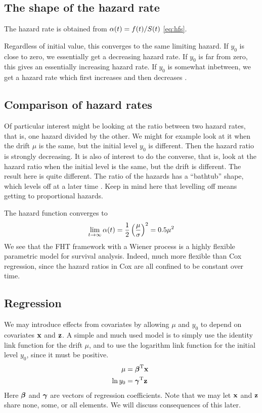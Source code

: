 \subsection{The shape of the hazard rate}
The hazard rate is obtained from $\alpha(t)=f(t)/S(t)$ \eqref{eq:hfs}.

Regardless of initial value, this converges to the same limiting hazard. If $y_0$ is close to zero, we essentially get a decreasing hazard rate. If $y_0$ is far from zero, this gives an essentially increasing hazard rate. If $y_0$ is somewhat inbetween, we get a hazard rate which first increases and then decreases \citep{ABG}.

\subsection{Comparison of hazard rates}
Of particular interest might be looking at the ratio between two hazard rates, that is, one hazard divided by the other. We might for example look at it when the drift $\mu$ is the same, but the initial level $y_0$ is different. Then the hazard ratio is strongly decreasing. It is also of interest to do the converse, that is, look at the hazard ratio when the initial level is the same, but the drift is different. The result here is quite different. The ratio of the hazards has a ``bathtub'' shape, which levels off at a later time \citep{ABG}. Keep in mind here that levelling off means getting to proportional hazards.

The hazard function converges to
\begin{equation}
    \lim_{t\to\infty}\alpha(t)=\frac{1}{2}\left(\frac{\mu}{\sigma}\right)^2=0.5\mu^2
\end{equation}
We see that the FHT framework with a Wiener process is a highly flexible parametric model for survival analysis. Indeed, much more flexible than Cox regression, since the hazard ratios in Cox are all confined to be constant over time.

\subsection{Regression}
We may introduce effects from covariates by allowing $\mu$ and $y_0$ to depend on covariates $\mathbf{x}$ and $\mathbf{z}$. A simple and much used model is to simply use the identity link function for the drift $\mu$, and to use the logarithm link function for the initial level $y_0$, since it must be positive.
\begin{align}\label{eq:coeffs}
\begin{split}
    \mu&=\bbeta^\T\x \\
    \ln y_0&=\bgamma^\T\z
\end{split}
\end{align}
Here $\boldsymbol{\beta}$ and $\boldsymbol{\gamma}$ are vectors of regression coefficients. Note that we may let $\mathbf{x}$ and $\mathbf{z}$ share none, some, or all elements. We will discuss consequences of this later.

